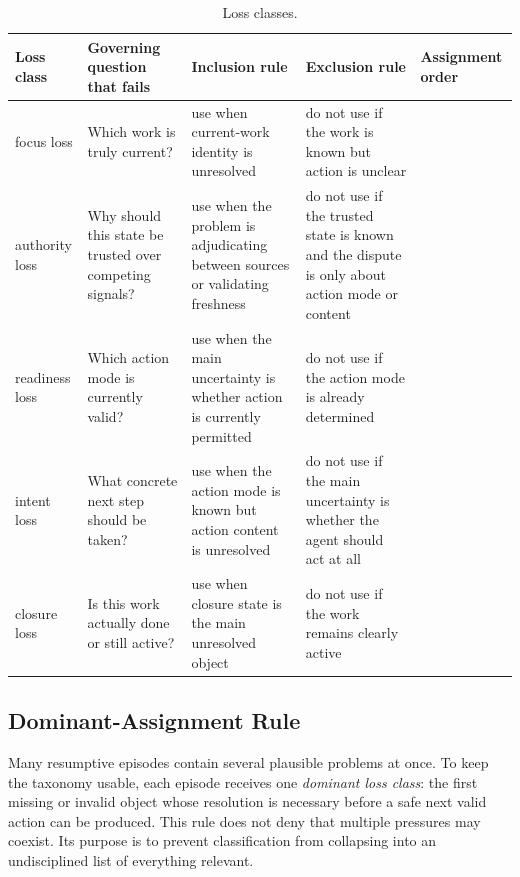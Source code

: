 \documentclass[a4paper,fleqn]{cas-sc}
\begin{document}
\begin{table}[H]
\caption{Loss classes.}
\label{tab:loss-classes}
\centering
\footnotesize
\setlength{\tabcolsep}{4pt}
\begin{tabularx}{\textwidth}{>{\raggedright\arraybackslash}p{} >{\raggedright\arraybackslash}p{} >{\raggedright\arraybackslash}p{} >{\raggedright\arraybackslash}p{} >{\raggedright\arraybackslash}p{}}
\toprule
Loss class & Governing question that fails & Inclusion rule & Exclusion rule & Assignment order \\
\midrule
focus loss & Which work is truly current? & use when current-work identity is unresolved & do not use if the work is known but action is unclear & 1 \\
authority loss & Why should this state be trusted over competing signals? & use when the problem is adjudicating between sources or validating freshness & do not use if the trusted state is known and the dispute is only about action mode or content & 2 \\
readiness loss & Which action mode is currently valid? & use when the main uncertainty is whether action is currently permitted & do not use if the action mode is already determined & 3 \\
intent loss & What concrete next step should be taken? & use when the action mode is known but action content is unresolved & do not use if the main uncertainty is whether the agent should act at all & 4 \\
closure loss & Is this work actually done or still active? & use when closure state is the main unresolved object & do not use if the work remains clearly active & 5 \\
\bottomrule
\end{tabularx}
\end{table}

\subsection{Dominant-Assignment Rule}

Many resumptive episodes contain several plausible problems at once. To keep the taxonomy usable, each episode receives one \emph{dominant loss class}: the first missing or invalid object whose resolution is necessary before a safe next valid action can be produced. This rule does not deny that multiple pressures may coexist. Its purpose is to prevent classification from collapsing into an undisciplined list of everything relevant.
\end{document}
